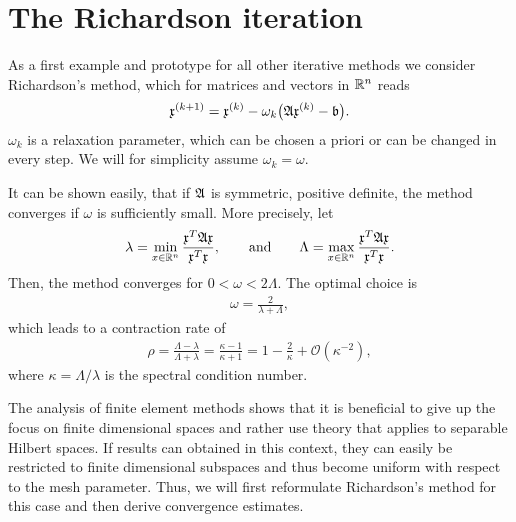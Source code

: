 
\section{The Richardson iteration}

\begin{intro}
  As a first example and prototype for all other iterative methods we
  consider Richardson's method, which for matrices and vectors in
  $\mathbb R^n$ reads
  \begin{gather}
    \label{eq:richardson:1}
    \mathfrak{x}^{(k+1)}
    = \mathfrak{x}^{(k)}
    - \omega_k \bigl(\mathfrak{A} \mathfrak{x}^{(k)} - \mathfrak{b} \bigr).
  \end{gather}
  $\omega_k$ is a relaxation parameter, which can be chosen a priori
  or can be changed in every step. We will for simplicity assume
  $\omega_k = \omega$.
  
  It can be shown easily, that if $\mathfrak{A}$ is symmetric, positive definite,
  the method converges if $\omega$ is sufficiently small. More
  precisely, let
  \begin{gather}
    \label{eq:richardson:3}
    \lambda
    = \min_{x\in \mathbb R^n} \frac{\mathfrak{x}^T\mathfrak{A}\mathfrak{x}}{\mathfrak{x}^T\mathfrak{x}},
    \qquad\text{and}\qquad
    \Lambda = \max_{x\in \mathbb R^n} \frac{\mathfrak{x}^T\mathfrak{A}\mathfrak{x}}{\mathfrak{x}^T\mathfrak{x}}.
  \end{gather}
  Then, the method converges for $0 < \omega < 2\Lambda$. The optimal
  choice is
  \begin{gather}
    \label{eq:richardson:2}
    \omega = \frac{2}{\lambda+\Lambda},
  \end{gather}
  which leads to a contraction rate of
  \begin{gather}
    \label{eq:richardson:4}
    \rho = \frac{\Lambda-\lambda}{\Lambda+\lambda} =
    \frac{\kappa-1}{\kappa+1} = 1 -\frac2\kappa + \mathcal
    O(\kappa^{-2}),
  \end{gather}
  where $\kappa = \Lambda/\lambda$ is the spectral condition number. 
\end{intro}

\begin{intro}
  The analysis of finite element methods shows that it is beneficial
  to give up the focus on finite dimensional spaces and rather use
  theory that applies to separable Hilbert spaces. If results can
  obtained in this context, they can easily be restricted to finite
  dimensional subspaces and thus become uniform with respect to the
  mesh parameter. Thus, we will first reformulate Richardson's method
  for this case and then derive convergence estimates.
\end{intro}

